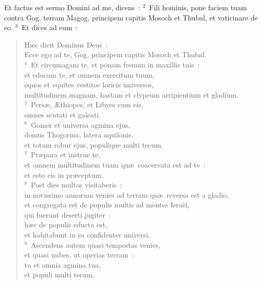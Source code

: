 \lettrine[lines=10,image=true,loversize=0.05,lraise=-0.03]{E}{}t factus est sermo Domini ad me, dicens~:
${}^{2}$~Fili hominis, pone faciem tuam contra Gog, terram Magog, principem capitis Mosoch et Thubal, et vaticinare de eo.
${}^{3}$~Et dices ad eum~: \begin{flushleft}\begin{verse}H\ae c dicit Dominus Deus~:\\ Ecce ego ad te, Gog, principem capitis Mosoch et Thubal.\\
${}^{4}$~Et circumagam te, et ponam frenum in maxillis tuis~:\\ et educam te, et omnem exercitum tuum,\\ equos et equites vestitos loricis universos,\\ multitudinem magnam, hastam et clypeum arripientium et gladium.\\
${}^{5}$~Pers\ae , \AE thiopes, et Libyes cum eis,\\ omnes scutati et galeati.\\
${}^{6}$~Gomer et universa agmina ejus,\\ domus Thogorma, latera aquilonis,\\ et totum robur ejus, populique multi tecum.\\
${}^{7}$~Pr\ae para et instrue te,\\ et omnem multitudinem tuam qu\ae\ coacervata est ad te~:\\ et esto eis in pr\ae ceptum.\\
${}^{8}$~Post dies multos visitaberis~:\\ in novissimo annorum venies ad terram qu\ae\ reversa est a gladio,\\ et congregata est de populis multis ad montes Isra\"el,\\ qui fuerunt deserti jugiter~:\\ h\ae c de populis educta est,\\ et habitabunt in ea confidenter universi.\\
${}^{9}$~Ascendens autem quasi tempestas venies,\\ et quasi nubes, ut operias terram~:\\ tu et omnia agmina tua,\\ et populi multi tecum.\end{verse}\end{flushleft}


